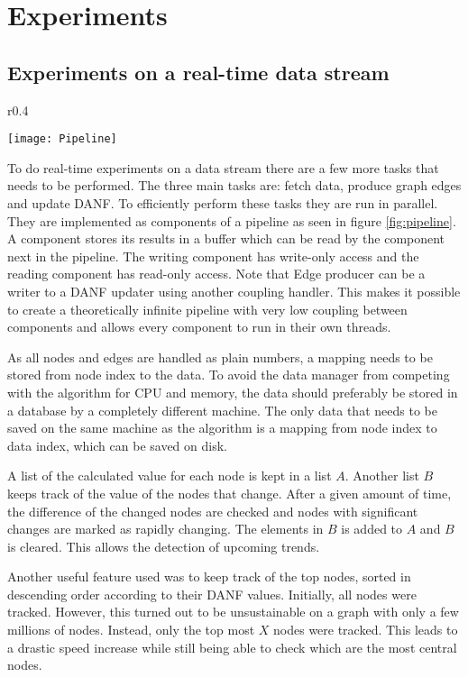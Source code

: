 \chapter{Experiments}

\section{Experiments on a real-time data stream}

\begin{wrapfigure}{r}{0.4\textwidth}
  \begin{center}
    \texttt{[image: Pipeline]}
  \end{center}
  \caption{Parallel-compatible pipeline}
  \label{fig:pipeline}
\end{wrapfigure}

To do real-time experiments on a data stream there are a few more tasks that needs to be performed. The three main tasks are: fetch data, produce graph edges and update DANF. To efficiently perform these tasks they are run in parallel. They are implemented as components of a pipeline as seen in figure \ref{fig:pipeline}. A component stores its results in a buffer which can be read by the component next in the pipeline. The writing component has write-only access and the reading component has read-only access. Note that Edge producer can be a writer to a DANF updater using another coupling handler. This makes it possible to create a theoretically infinite pipeline with very low coupling between components and allows every component to run in their own threads.

As all nodes and edges are handled as plain numbers, a mapping needs to be stored from node index to the data. To avoid the data manager from competing with the algorithm for CPU and memory, the data should preferably be stored in a database by a completely different machine. The only data that needs to be saved on the same machine as the algorithm is a mapping from node index to data index, which can be saved on disk.

A list of the calculated value for each node is kept in a list $A$. Another list $B$ keeps track of the value of the nodes that change. After a given amount of time, the difference of the changed nodes are checked and nodes with significant changes are marked as rapidly changing. The elements in $B$ is added to $A$ and $B$ is cleared. This allows the detection of upcoming trends. 

Another useful feature used was to keep track of the top nodes, sorted in descending order according to their DANF values. Initially, all nodes were tracked. However, this turned out to be unsustainable on a graph with only a few millions of nodes. Instead, only the top most $X$ nodes were tracked. This leads to a drastic speed increase while still being able to check which are the most central nodes. 


